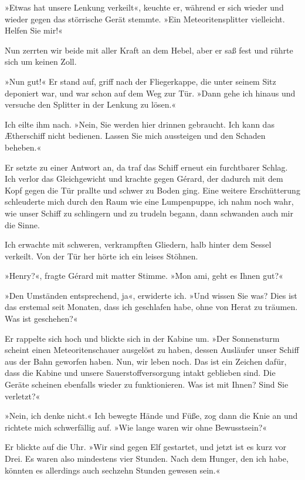 »Etwas hat unsere Lenkung verkeilt«, keuchte er, während er sich
wieder und wieder gegen das störrische Gerät stemmte. »Ein
Meteoritensplitter vielleicht. Helfen Sie mir!«

Nun zerrten wir beide mit aller Kraft an dem Hebel, aber er saß
fest und rührte sich um keinen Zoll.

»Nun gut!« Er stand auf, griff nach der Fliegerkappe, die unter
seinem Sitz deponiert war, und war schon auf dem Weg zur Tür. »Dann
gehe ich hinaus und versuche den Splitter in der Lenkung zu
lösen.«

Ich eilte ihm nach. »Nein, Sie werden hier drinnen gebraucht. Ich
kann das Ætherschiff nicht bedienen. Lassen Sie mich aussteigen und
den Schaden beheben.«

Er setzte zu einer Antwort an, da traf das Schiff erneut ein
furchtbarer Schlag. Ich verlor das Gleichgewicht und krachte gegen
Gérard, der dadurch mit dem Kopf gegen die Tür prallte und schwer
zu Boden ging. Eine weitere Erschütterung schleuderte mich durch
den Raum wie eine Lumpenpuppe, ich nahm noch wahr, wie unser Schiff
zu schlingern und zu trudeln begann, dann schwanden auch mir die
Sinne.

\bigpar

Ich erwachte mit schweren, verkrampften Gliedern, halb hinter dem
Sessel verkeilt. Von der Tür her hörte ich ein leises Stöhnen.

»Henry?«, fragte Gérard mit matter Stimme. »Mon ami, geht es Ihnen
gut?«

»Den Umständen entsprechend, ja«, erwiderte ich. »Und wissen Sie
was? Dies ist das erstemal seit Monaten, dass ich geschlafen habe,
ohne von Herat zu träumen. Was ist geschehen?«

Er rappelte sich hoch und blickte sich in der Kabine um. »Der
Sonnensturm scheint einen Meteoritenschauer ausgelöst zu haben,
dessen Ausläufer unser Schiff aus der Bahn geworfen haben. Nun, wir
leben noch. Das ist ein Zeichen dafür, dass die Kabine und unsere
Sauerstoffversorgung intakt geblieben sind. Die Geräte scheinen
ebenfalls wieder zu funktionieren. Was ist mit Ihnen? Sind Sie
verletzt?«

»Nein, ich denke nicht.« Ich bewegte Hände und Füße, zog dann die
Knie an und richtete mich schwerfällig auf. »Wie lange waren wir
ohne Bewusstsein?«

Er blickte auf die Uhr. »Wir sind gegen Elf gestartet, und jetzt
ist es kurz vor Drei. Es waren also mindestens vier Stunden. Nach
dem Hunger, den ich habe, könnten es allerdings auch sechzehn
Stunden gewesen sein.«

